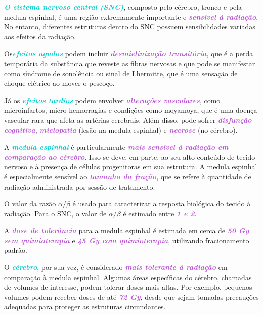 \documentclass[11pt,a4paper]{article}
\newcounter{exemplo}
\begin{document}
	\textcolor{DarkTurquoise}{\textbf{\textit{O sistema nervoso central (SNC)}}}, composto pelo cérebro, tronco e pela medula espinhal, é uma região extremamente importante e \textcolor{MediumOrchid}{\textbf{\textit{sensível à radiação}}}. No entanto, diferentes estruturas dentro do SNC possuem sensibilidades variadas aos efeitos da radiação.

	Os\textcolor{DarkTurquoise}{\textbf{\textit{efeitos agudos}}} podem incluir \textcolor{MediumOrchid}{\textbf{\textit{desmielinização transitória}}}, que é a perda temporária da substância que reveste as fibras nervosas e que  pode se manifestar  como síndrome de sonolência ou sinal de Lhermitte, que é uma sensação de choque elétrico ao mover o pescoço.

	Já os \textcolor{DarkTurquoise}{\textbf{\textit{efeitos tardios}}} podem envolver \textcolor{MediumOrchid}{\textbf{\textit{alterações vasculares}}}, como microinfartos, micro-hemorragias e condições como moyamoya, que é uma doença vascular rara que afeta as artérias cerebrais. Além disso, pode sofrer \textcolor{MediumOrchid}{\textbf{\textit{disfunção cognitiva}}}, \textcolor{MediumOrchid}{\textbf{\textit{mielopatia}}} (lesão na medula espinhal) e \textcolor{MediumOrchid}{\textbf{\textit{necrose}}} (no cérebro).

	A \textcolor{DarkTurquoise}{\textbf{\textit{medula espinhal}}} é particularmente \textcolor{MediumOrchid}{\textbf{\textit{mais sensível à radiação em comparação ao cérebro}}}. Isso se deve, em parte, ao seu alto conteúdo de tecido nervoso e à presença de células progenitoras em sua estrutura. A medula espinhal é especialmente sensível ao \textcolor{MediumOrchid}{\textbf{\textit{tamanho da fração}}}, que se refere à quantidade de radiação administrada por sessão de tratamento. 
	
	O valor da razão $\alpha/\beta$ é usado para caracterizar a resposta biológica do tecido à radiação. Para o SNC, o valor de $\alpha/\beta$ é estimado entre \textcolor{MediumOrchid}{\textbf{\textit{1 e 2}}}.

	A \textcolor{MediumOrchid}{\textbf{\textit{dose de tolerância}}} para a medula espinhal é estimada em cerca de \textcolor{MediumOrchid}{\textbf{\textit{50 Gy sem quimioterapia}}} e \textcolor{MediumOrchid}{\textbf{\textit{45 Gy com quimioterapia}}}, utilizando fracionamento padrão. 

	O \textcolor{DarkTurquoise}{\textbf{\textit{cérebro}}}, por sua vez, é considerado \textcolor{MediumOrchid}{\textbf{\textit{mais tolerante à radiação}}} em comparação à medula espinhal. Algumas áreas específicas do cérebro, chamadas de volumes de interesse, podem tolerar doses mais altas. Por exemplo, pequenos volumes podem receber doses de até \textcolor{MediumOrchid}{\textbf{\textit{72 Gy}}}, desde que sejam tomadas precauções adequadas para proteger as estruturas circundantes.
\end{document}
